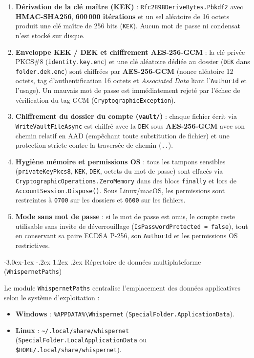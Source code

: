 \documentclass[11pt,a4paper]{article}
\makeatletter
\renewcommand\subsection{\@startsection{subsection}{2}{\z@}%
                                     {-3.0ex\@plus -1ex \@minus -.2ex}%
                                     {1.2ex \@plus .2ex}%
                                     {\normalfont\large\bfseries\color{PrimaryBlue}}}
\makeatother
\begin{document}
\begin{enumerate}
    \item \textbf{Dérivation de la clé maître (KEK)} : \texttt{Rfc2898DeriveBytes.Pbkdf2} avec \textbf{HMAC-SHA256}, \textbf{600\,000 itérations} et un sel aléatoire de 16 octets produit une clé maître de 256 bits (\texttt{KEK}). Aucun mot de passe ni condensat n'est stocké sur disque.
    \item \textbf{Enveloppe KEK / DEK et chiffrement AES-256-GCM} : la clé privée PKCS\#8 (\texttt{identity.key.enc}) et une clé aléatoire dédiée au dossier (\texttt{DEK} dans \texttt{folder.dek.enc}) sont chiffrées par \textbf{AES-256-GCM} (nonce aléatoire 12 octets, tag d'authentification 16 octets et \emph{Associated Data} liant l'\texttt{AuthorId} et l'usage). Un mauvais mot de passe est immédiatement rejeté par l'échec de vérification du tag GCM (\texttt{CryptographicException}).
    \item \textbf{Chiffrement du dossier du compte (\texttt{vault/})} : chaque fichier écrit via \texttt{WriteVaultFileAsync} est chiffré avec la \texttt{DEK} sous \textbf{AES-256-GCM} avec son chemin relatif en AAD (empêchant toute substitution de fichier) et une protection stricte contre la traversée de chemin (\texttt{..}).
    \item \textbf{Hygiène mémoire et permissions OS} : tous les tampons sensibles (\texttt{privateKeyPkcs8}, \texttt{KEK}, \texttt{DEK}, octets du mot de passe) sont effacés via \texttt{CryptographicOperations.ZeroMemory} dans des blocs \texttt{finally} et lors de \texttt{AccountSession.Dispose()}. Sous Linux/macOS, les permissions sont restreintes à \texttt{0700} sur les dossiers et \texttt{0600} sur les fichiers.
    \item \textbf{Mode sans mot de passe} : si le mot de passe est omis, le compte reste utilisable sans invite de déverrouillage (\texttt{IsPasswordProtected = false}), tout en conservant sa paire ECDSA P-256, son \texttt{AuthorId} et les permissions OS restrictives.
\end{enumerate}

\subsection{Répertoire de données multiplateforme (\texttt{WhispernetPaths})}

Le module \texttt{WhispernetPaths} centralise l'emplacement des données applicatives selon le système d'exploitation :
\begin{itemize}
    \item \textbf{Windows} : \texttt{\%APPDATA\%\textbackslash Whispernet} (\texttt{SpecialFolder.ApplicationData}).
    \item \textbf{Linux} : \texttt{\textasciitilde/.local/share/whispernet} (\texttt{SpecialFolder.LocalApplicationData} ou \texttt{\$HOME/.local/share/whispernet}).
\end{itemize}
\end{document}
